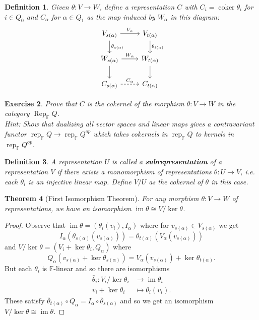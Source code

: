 \documentclass{book}
\newtheorem{theorem}{Theorem}[section]
\newtheorem{definition}[theorem]{Definition}
\newtheorem {exercise}[theorem] {Exercise}
\DeclareMathOperator{\Rep}{Rep}
\DeclareMathOperator{\rep}{rep}
\DeclareMathOperator{\im}{im}
\DeclareMathOperator{\coker}{coker}
\begin{document}
        \begin{definition}
            Given $\theta:V\to W$, define a representation $C$ with $C_i=\coker\theta_i$ for $i\in Q_0$ and $C_\alpha$ for $\alpha\in Q_1$ as the map induced by $W_\alpha$ in this diagram:
            \[ \begin{tikzcd}
	    	V_{s(\alpha)} \arrow{r}{V_\alpha} \arrow{d}{\theta_{s(\alpha)}} & V_{t(\alpha)} \arrow{d}{\theta_{t(\alpha)}}\\
	    	W_{s(\alpha)} \arrow{d} \arrow{r}{W_\alpha}& W_{t(\alpha)}\arrow{d}\\
	    	C_{s(\alpha)} \arrow[dashed]{r}{C_\alpha}  & C_{t(\alpha)}
	    	\end{tikzcd}\]
        \end{definition}
        
        \begin{exercise}
            Prove that $C$ is the cokernel of the morphism $\theta:V\to W$ in the category $\Rep_\mathbb{F}Q$. \\ Hint: Show that dualizing all vector spaces and linear maps gives a contravariant functor $\rep_\mathbb{F}Q \to \rep_\mathbb{F}Q^{op}$ which takes cokernels in $\rep_\mathbb{F}Q$ to kernels in $\rep_\mathbb{F}Q^{op}$.
        \end{exercise}

        \begin{definition}
            A representation $U$ is called a \textbf{subrepresentation} of a representation $V$ if there exists a monomorphism of representations $\theta: U\to V$, i.e. each $\theta_i$ is an injective linear map. Define $V/U$ as the cokernel of $\theta$ in this case.
        \end{definition}
        
        \begin{theorem}[First Isomorphism Theorem]
            For any morphism $\theta: V\to W$ of representations, we have an isomorphism $\im\theta\cong V / \ker\theta$.
        \end{theorem}
        
        \begin{proof}
            Observe that $\im\theta=(\theta_i(v_i),I_\alpha)$ where for $v_{s(\alpha)}\in V_{s(\alpha)}$ we get \[I_\alpha(\theta_{s(\alpha)}(v_{s(\alpha)}))=\theta_{t(\alpha)}(V_\alpha(v_{s(\alpha)}))\] and $V/\ker\theta=(V_i+\ker\theta_i,Q_\alpha)$ where \[Q_\alpha(v_{s(\alpha)}+\ker\theta_{s(\alpha)})=V_\alpha(v_{s(\alpha)})+\ker\theta_{t(\alpha)}.\] But each $\theta_i$ is $\mathbb{F}$-linear and so there are isomorphisms 
                \begin{align*}
                    \bar{\theta}_i:V_i/\ker\theta_i &\to \im\theta_i \\
                    v_i+\ker\theta_i &\mapsto \theta_i(v_i).
                \end{align*}
            These satisfy $\bar{\theta}_{t(\alpha)}\circ Q_\alpha=I_\alpha\circ\bar{\theta}_{s(\alpha)}$ and so we get an isomorphism $V/\ker\theta\cong\im\theta$.
        \end{proof}
        
\end{document}
